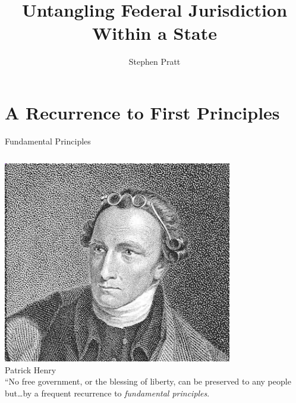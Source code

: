 




\title[Untangling Federal Jurisdiction]{Untangling Federal Jurisdiction Within a State}
\author{Stephen Pratt}

\section{A Recurrence to First Principles}

%

\begin{frame}{Fundamental Principles}
    \begin{columns}[onlytextwidth]
            \centering
            \includegraphics[width=0.75\textwidth]{img/patrick-henry.png} \\
            Patrick Henry \\

            ``No free government, or the blessing of liberty, can be preserved to any people but\ldots by a frequent recurrence to \emph{fundamental principles}.
    \end{columns}
\end{frame}

